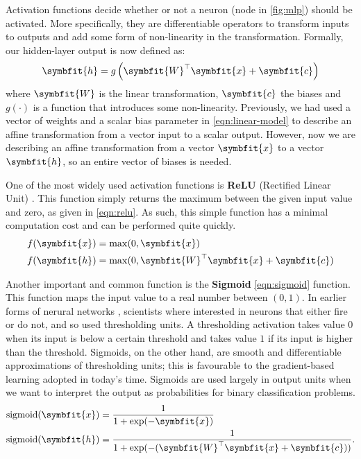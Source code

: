 Activation functions decide whether or not a neuron (node in \cref{fig:mlp}) should be activated. More specifically, they are differentiable operators to transform inputs to outputs and add some form of non-linearity in the transformation. Formally, our hidden-layer output is now defined as:
\begin{equation}
\symbfit{h}=g\left(\symbfit{W}^{\top} \symbfit{x}+\symbfit{c}\right)
\end{equation}
where $\symbfit{W}$ is the linear transformation, $\symbfit{c}$ the biases and $g(\cdot)$ is a function that introduces some non-linearity. Previously, we had used a vector of weights and a scalar bias parameter in \cref{eqn:linear-model} to describe an affine transformation from a vector input to a scalar output. However, now we are describing an affine transformation from a vector $\symbfit{x}$ to a vector $\symbfit{h}$, so an entire vector of biases is needed.

One of the most widely used activation functions is \textbf{ReLU} (Rectified Linear Unit) \parencite{Fukushima1975}. This function simply returns the maximum between the given input value and zero, as given in \cref{eqn:relu}. As such, this simple function has a minimal computation cost and can be performed quite quickly.
\begin{equation}\label{eqn:relu}
    \begin{split}
        f(\symbfit{x}) & = \operatorname{max}(0, \symbfit{x})\\
        f(\symbfit{h}) & = \operatorname{max}(0, \symbfit{W}^\top\symbfit{x} + \symbfit{c})
    \end{split}
\end{equation}

Another important and common function is the \textbf{Sigmoid} \cref{eqn:sigmoid} function. This function maps the input value to a real number between $(0, 1)$.
In earlier forms of nerural networks \parencite{mcculloch1943logical}, scientists where interested in neurons that either fire or do not, and so used thresholding units. A thresholding activation takes value $0$ when its input is below a certain threshold and takes value $1$ if its input is higher than the threshold. 
Sigmoids, on the other hand, are smooth and differentiable approximations of thresholding units; this is favourable to the gradient-based learning adopted in today's time.
Sigmoids are used largely in output units when we want to interpret the output as probabilities for binary classification problems.
\begin{equation}\label{eqn:sigmoid}
    \begin{split}
        \operatorname{sigmoid}(\symbfit{x}) & = \frac{1}{1 + \exp(-\symbfit{x})} \\
        \operatorname{sigmoid}(\symbfit{h}) & = \frac{1}{1 + \exp(-(\symbfit{W}^\top\symbfit{x}+\symbfit{c}))}.
    \end{split}
\end{equation}


